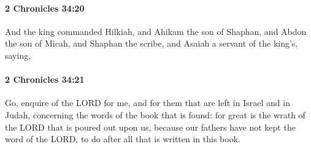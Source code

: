 		\paragraph{2 Chronicles 34:20} %
			\label{2CHRONICLES-34-20}

			And the king commanded Hilkiah, and Ahikam the son of Shaphan, and Abdon the son of Micah, and Shaphan the scribe, and Asaiah a servant of the king's, saying,


		\paragraph{2 Chronicles 34:21} %
			\label{2CHRONICLES-34-21}

			Go, enquire of the LORD for me, and for them that are left in Israel and in Judah, concerning the words of the book that is found: for great is the wrath of the LORD that is poured out upon us, because our fathers have not kept the word of the LORD, to do after all that is written in this book.

